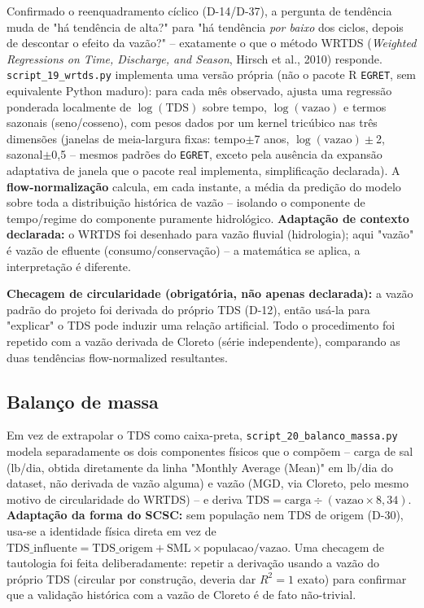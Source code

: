 Confirmado o reenquadramento cíclico (D-14/D-37), a pergunta de tendência muda de "há tendência de alta?" para "há tendência \textit{por baixo} dos ciclos, depois de descontar o efeito da vazão?" -- exatamente o que o método WRTDS (\textit{Weighted Regressions on Time, Discharge, and Season}, Hirsch et al., 2010) responde. \texttt{script\_19\_wrtds.py} implementa uma versão própria (não o pacote R \texttt{EGRET}, sem equivalente Python maduro): para cada mês observado, ajusta uma regressão ponderada localmente de $\log(\mathrm{TDS})$ sobre tempo, $\log(\mathrm{vazao})$ e termos sazonais (seno/cosseno), com pesos dados por um kernel tricúbico nas três dimensões (janelas de meia-largura fixas: tempo$\pm$7 anos, $\log(\mathrm{vazao})\pm$2, sazonal$\pm$0,5 -- mesmos padrões do \texttt{EGRET}, exceto pela ausência da expansão adaptativa de janela que o pacote real implementa, simplificação declarada). A \textbf{flow-normalização} calcula, em cada instante, a média da predição do modelo sobre toda a distribuição histórica de vazão -- isolando o componente de tempo/regime do componente puramente hidrológico. \textbf{Adaptação de contexto declarada:} o WRTDS foi desenhado para vazão fluvial (hidrologia); aqui "vazão" é vazão de efluente (consumo/conservação) -- a matemática se aplica, a interpretação é diferente.

\textbf{Checagem de circularidade (obrigatória, não apenas declarada):} a vazão padrão do projeto foi derivada do próprio TDS (D-12), então usá-la para "explicar" o TDS pode induzir uma relação artificial. Todo o procedimento foi repetido com a vazão derivada de Cloreto (série independente), comparando as duas tendências flow-normalized resultantes.

\subsection{Balanço de massa}

Em vez de extrapolar o TDS como caixa-preta, \texttt{script\_20\_balanco\_massa.py} modela separadamente os dois componentes físicos que o compõem -- carga de sal (lb/dia, obtida diretamente da linha "Monthly Average (Mean)" em lb/dia do dataset, não derivada de vazão alguma) e vazão (MGD, via Cloreto, pelo mesmo motivo de circularidade do WRTDS) -- e deriva $\mathrm{TDS} = \mathrm{carga} \div (\mathrm{vazao} \times 8{,}34)$. \textbf{Adaptação da forma do SCSC:} sem população nem TDS de origem (D-30), usa-se a identidade física direta em vez de $\mathrm{TDS\_influente} = \mathrm{TDS\_origem} + \mathrm{SML} \times \mathrm{populacao} / \mathrm{vazao}$. Uma checagem de tautologia foi feita deliberadamente: repetir a derivação usando a vazão do próprio TDS (circular por construção, deveria dar $R^2=1$ exato) para confirmar que a validação histórica com a vazão de Cloreto é de fato não-trivial.

